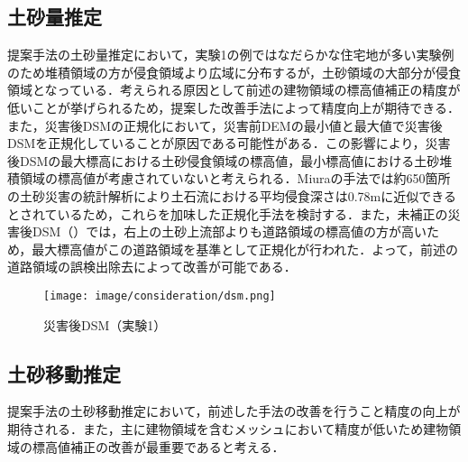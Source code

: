     \subsection*{土砂量推定}
      提案手法の土砂量推定において，実験1の例ではなだらかな住宅地が多い実験例のため堆積領域の方が侵食領域より広域に分布するが，土砂領域の大部分が侵食領域となっている．考えられる原因として前述の建物領域の標高値補正の精度が低いことが挙げられるため，提案した改善手法によって精度向上が期待できる．また，災害後DSMの正規化において，災害前DEMの最小値と最大値で災害後DSMを正規化していることが原因である可能性がある．この影響により，災害後DSMの最大標高における土砂侵食領域の標高値，最小標高値における土砂堆積領域の標高値が考慮されていないと考えられる．Miuraの手法\cite{土砂量解析5}では約650箇所の土砂災害の統計解析により土石流における平均侵食深さは0.78mに近似できるとされているため，これらを加味した正規化手法を検討する．また，未補正の災害後DSM（）では，右上の土砂上流部よりも道路領域の標高値の方が高いため，最大標高値がこの道路領域を基準として正規化が行われた．よって，前述の道路領域の誤検出除去によって改善が可能である．
      
      \begin{figure}[t]
        \centering
        \texttt{[image: image/consideration/dsm.png]}
        \caption{災害後DSM（実験1）}
        \label{災害後DSM（実験1）}
      \end{figure}


    \subsection*{土砂移動推定}
      提案手法の土砂移動推定において，前述した手法の改善を行うこと精度の向上が期待される．また，主に建物領域を含むメッシュにおいて精度が低いため建物領域の標高値補正の改善が最重要であると考える．
